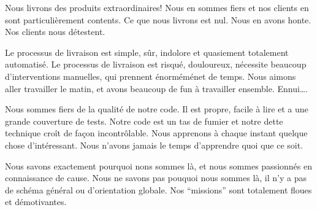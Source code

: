 \documentclass[a4paper]{article}
\newlength\cardheight
\newlength\cardwidth
\begin{document}
\clearpage


\clearpage

%
  {Nous livrons des produits extraordinaires! Nous en sommes fiers et nos clients en sont particulièrement contents.}
  {Ce que nous livrons est nul. Nous en avons honte. Nos clients nous d\'etestent.}
%


\clearpage
{}
  {Le processus de livraison est simple, sûr, indolore et quasiement totalement automatis\'e.}
  {Le processus de livraison est risqu\'e, douloureux, n\'ecessite beaucoup d'interventions manuelles, qui prennent \'enorm\'em\'enet de temps.}
%
\clearpage
{}
  {Nous aimons aller travailler le matin, et avons beaucoup de fun à travailler ensemble.}
  {Ennui\ldots{}.}
%
\clearpage

  {Nous sommes fiers de la qualit\'e de notre code. Il est propre, facile à lire et a une grande couverture de tests.}
  {Notre code est un tas de fumier et notre dette technique croît de fa\c{c}on incontrôlable.}
  \clearpage
{}
  {Nous apprenons à chaque instant quelque chose d'int\'eressant.}
  {Nous n'avons jamais le temps d'apprendre quoi que ce soit.}
  
  \clearpage
{}
  {Nous savons exactement pourquoi nons sommes là, et nous sommes passionn\'es en connaissance de cause.}
  {Nous ne savons pas pouquoi nous sommes là, il n'y a pas de sch\'ema g\'en\'eral  ou d'orientation globale. Nos ``missions'' sont totalement floues et d\'emotivantes.}
%
\end{document}
